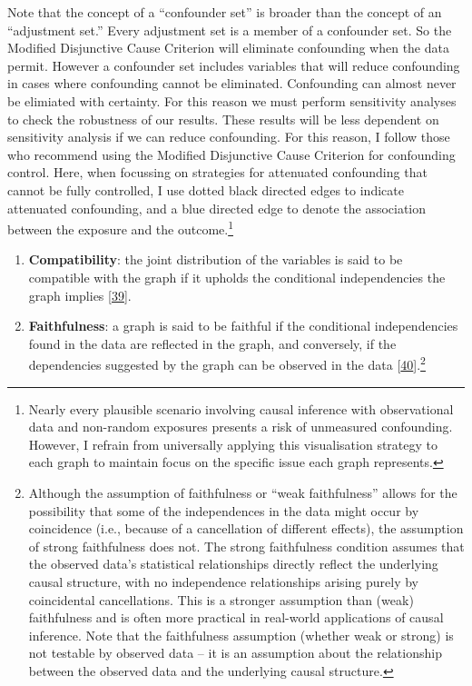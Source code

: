 \documentclass[
  singlecolumn]{article}
\begin{document}
Note that the concept of a ``confounder set'' is broader than the
concept of an ``adjustment set.'' Every adjustment set is a member of a
confounder set. So the Modified Disjunctive Cause Criterion will
eliminate confounding when the data permit. However a confounder set
includes variables that will reduce confounding in cases where
confounding cannot be eliminated. Confounding can almost never be
elimiated with certainty. For this reason we must perform sensitivity
analyses to check the robustness of our results. These results will be
less dependent on sensitivity analysis if we can reduce confounding. For
this reason, I follow those who recommend using the Modified Disjunctive
Cause Criterion for confounding control. Here, when focussing on
strategies for attenuated confounding that cannot be fully controlled, I
use dotted black directed edges to indicate attenuated confounding, and
a blue directed edge to denote the association between the exposure and
the outcome.\footnote{Nearly every plausible scenario involving causal
  inference with observational data and non-random exposures presents a
  risk of unmeasured confounding. However, I refrain from universally
  applying this visualisation strategy to each graph to maintain focus
  on the specific issue each graph represents.}

\begin{enumerate}
\def\labelenumi{\arabic{enumi}.}
\setcounter{enumi}{7}
\item
  \textbf{Compatibility}: the joint distribution of the variables is
  said to be compatible with the graph if it upholds the conditional
  independencies the graph implies
  {[}\protect\hyperlink{ref-pearl2009a}{39}{]}.
\item
  \textbf{Faithfulness}: a graph is said to be faithful if the
  conditional independencies found in the data are reflected in the
  graph, and conversely, if the dependencies suggested by the graph can
  be observed in the data
  {[}\protect\hyperlink{ref-pearl1995a}{40}{]}.\footnote{Although the
    assumption of faithfulness or ``weak faithfulness'' allows for the
    possibility that some of the independences in the data might occur
    by coincidence (i.e., because of a cancellation of different
    effects), the assumption of strong faithfulness does not. The strong
    faithfulness condition assumes that the observed data's statistical
    relationships directly reflect the underlying causal structure, with
    no independence relationships arising purely by coincidental
    cancellations. This is a stronger assumption than (weak)
    faithfulness and is often more practical in real-world applications
    of causal inference. Note that the faithfulness assumption (whether
    weak or strong) is not testable by observed data -- it is an
    assumption about the relationship between the observed data and the
    underlying causal structure.}
\end{enumerate}
\end{document}
